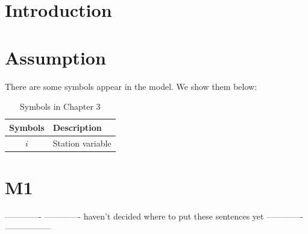 \documentclass{mcmthesis}
\begin{document}
\tableofcontents


\section{Introduction}




\section{Assumption}

There are some symbols appear in the model. We show them below:
\begin{table}[htbp]
\centering
\caption{Symbols in Chapter 3}
\begin{tabular}{cp{}}
\toprule
 Symbols & Description\\
\midrule
 $i$ & Station variable \\
\bottomrule
\end{tabular}
\end{table}

\section{M1}
------------- -------------  haven't decided where to put these sentences yet -------------  -----------------
\end{document}
